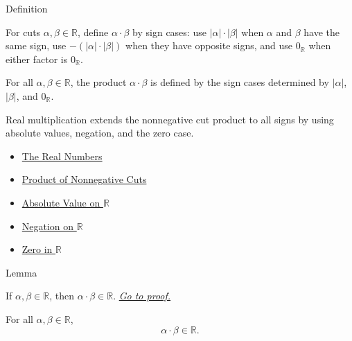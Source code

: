 \begin{definitionbox}{Definition}
\begin{definition}
\label{def:multiplication-on-r}
For cuts $\alpha,\beta\in\mathbb{R}$, define $\alpha\cdot\beta$ by sign cases:
use $|\alpha|\cdot|\beta|$ when $\alpha$ and $\beta$ have the same sign, use
$-(|\alpha|\cdot|\beta|)$ when they have opposite signs, and use
$0_{\mathbb{R}}$ when either factor is $0_{\mathbb{R}}$.
\end{definition}
\end{definitionbox}

\begin{remark*}
For all $\alpha,\beta\in\mathbb{R}$, the product $\alpha\cdot\beta$ is defined
by the sign cases determined by $|\alpha|$, $|\beta|$, and $0_{\mathbb{R}}$.
\end{remark*}

\begin{remark*}[Interpretation]
Real multiplication extends the nonnegative cut product to all signs by using
absolute values, negation, and the zero case.
\end{remark*}

\begin{dependencies}
\begin{itemize}
  \item \hyperref[def:reals]{The Real Numbers}
  \item \hyperref[def:product-nonnegative-on-r]{Product of Nonnegative Cuts}
  \item \hyperref[def:real-chapter-absolute-value-on-r]{Absolute Value on $\mathbb{R}$}
  \item \hyperref[def:negation-on-r]{Negation on $\mathbb{R}$}
  \item \hyperref[def:zero-in-r]{Zero in $\mathbb{R}$}
\end{itemize}
\end{dependencies}

\begin{lemmabox}{Lemma}
\begin{lemma}
\label{lem:product-of-cuts-is-a-cut}
If $\alpha,\beta\in\mathbb{R}$, then $\alpha\cdot\beta\in\mathbb{R}$.
\hyperref[prf:product-of-cuts-is-a-cut]{\textit{Go to proof.}}
\end{lemma}
\end{lemmabox}

\begin{remark*}
For all $\alpha,\beta\in\mathbb{R}$,
\[
\alpha\cdot\beta\in\mathbb{R}.
\]
\end{remark*}

